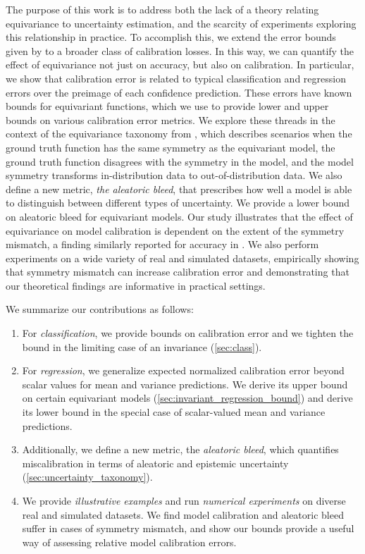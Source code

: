 \documentclass[10pt]{article} %
\theoremstyle{definition}
\begin{document}
The purpose of this work is to address both the lack of a theory relating equivariance to uncertainty estimation, and the scarcity of experiments exploring this relationship in practice. To accomplish this, we extend the error bounds given by \cite{wang2024general} to a broader class of calibration losses. In this way, we can quantify the effect of equivariance not just on accuracy, but also on calibration. In particular, we show that calibration error is related to typical classification and regression errors over the preimage of each confidence prediction. These errors have known bounds for equivariant functions, which we use to provide lower and upper bounds on various calibration error metrics. We explore these threads in the context of the equivariance taxonomy from \citep{wang2024general}, which describes scenarios when the ground truth function has the same symmetry as the equivariant model, the ground truth function disagrees with the symmetry in the model, and the model symmetry transforms in-distribution data to out-of-distribution data. We also define a new metric, \emph{the aleatoric bleed}, that prescribes how well a model is able to distinguish between different types of uncertainty. We provide a lower bound on aleatoric bleed for equivariant models. Our study illustrates that the effect of equivariance on model calibration is dependent on the extent of the symmetry mismatch, a finding similarly reported for accuracy in \cite{wang2023the, wang2024general}. We also perform experiments on a wide variety of real and simulated datasets, empirically showing that symmetry mismatch can increase calibration error and demonstrating that our theoretical findings are informative in practical settings. 

We summarize our contributions as follows: 

\begin{enumerate}
    \item For \emph{classification}, we provide bounds on calibration error and we tighten the bound in the limiting case of an invariance (\cref{sec:class}).  
    \item For \emph{regression}, we generalize expected normalized calibration error beyond scalar values for mean and variance predictions. We derive its upper bound on certain equivariant models (\cref{sec:invariant_regression_bound}) and derive its lower bound in the special case of scalar-valued mean and variance predictions. 
    \item Additionally, we define a new metric, the \emph{aleatoric bleed}, which quantifies miscalibration in terms of aleatoric and epistemic uncertainty (\cref{sec:uncertainty_taxonomy}).
    \item We provide \emph{illustrative examples} and run \emph{numerical experiments} on diverse real and simulated datasets. We find model calibration and aleatoric bleed suffer in cases of symmetry mismatch, and show our bounds provide a useful way of assessing relative model calibration errors.
\end{enumerate}
\end{document}
